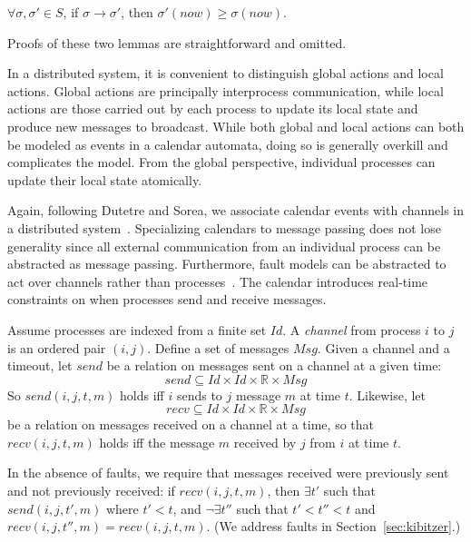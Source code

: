 \documentclass{llncs/llncs}
\newcommand{\Id}{\ensuremath{\mathit{Id}}\xspace}
\newcommand{\Msg}{\ensuremath{\mathit{Msg}}\xspace}
\begin{document}
\begin{lemma}
$\forall \sigma, \sigma' \in S$, if $\sigma \rightarrow \sigma'$, then $\sigma'(now) \geq \sigma(now)$.
\end{lemma}

Proofs of these two lemmas are straightforward and omitted.

In a distributed system, it is convenient to distinguish global actions and local actions. Global actions are principally interprocess communication, while local actions are those carried out by each process to update its local state and produce new messages to broadcast. While both global and local actions can both be modeled as events in a calendar automata, doing so is generally overkill and complicates the model. From the global perspective, individual processes can update their local state atomically.

Again, following Dutetre and Sorea, we associate calendar events with channels in a distributed system~\cite{cal}. Specializing calendars to message passing does not lose generality since all external communication from an individual process can be abstracted as message passing. Furthermore, fault models can be abstracted to act over channels rather than processes~\cite{abstractions}. The calendar introduces real-time constraints on when processes send and receive messages.

Assume processes are indexed from a finite set $\Id$. A \emph{channel} from process $i$ to $j$ is an ordered pair $(i,j)$. Define a set of messages $\Msg$. Given a channel and a timeout, let $send$ be a relation on messages sent on a channel at a given time:
$$send \subseteq \Id \times \Id \times \mathbb{R} \times \Msg$$
So $send(i, j, t, m)$ holds iff $i$ sends to $j$ message $m$ at time $t$. Likewise, let
$$recv \subseteq \Id \times \Id \times \mathbb{R} \times \Msg$$
be a relation on messages received on a channel at a time, so that $recv(i, j, t, m)$ holds iff the message $m$ received by $j$ from $i$ at time $t$.

In the absence of faults, we require that messages received were previously sent and not previously received: if $recv(i, j, t, m)$, then $\exists t'$ such that $send(i, j, t', m)$ where $t' < t$, and $\neg\exists t''$ such that $t' < t'' < t$ and $recv(i, j, t'', m) = recv(i, j, t, m)$. (We address faults in Section~\ref{sec:kibitzer}.)
\end{document}
